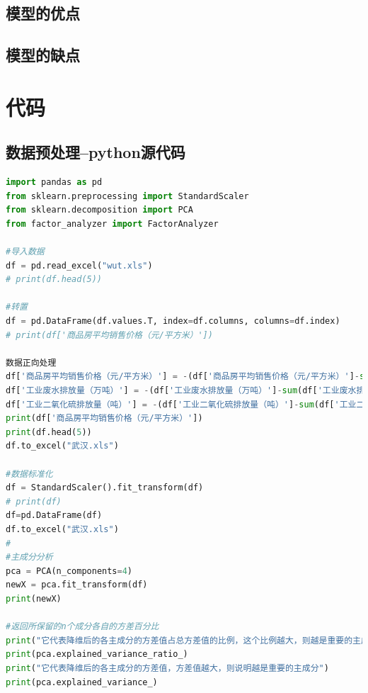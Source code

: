 \documentclass{whutmod}
\begin{document}
	\subsection{模型的优点}

	
	\subsection{模型的缺点}

    
	\newpage	%
	\nocite{*}		%

	
	\newpage
	\appendix %
\section{代码}
\subsection{数据预处理--python源代码}
\begin{lstlisting}[language=python]%这里修改语言
import pandas as pd
from sklearn.preprocessing import StandardScaler
from sklearn.decomposition import PCA
from factor_analyzer import FactorAnalyzer

#导入数据
df = pd.read_excel("wut.xls")
# print(df.head(5))

#转置
df = pd.DataFrame(df.values.T, index=df.columns, columns=df.index)
# print(df['商品房平均销售价格（元/平方米）'])

数据正向处理
df['商品房平均销售价格（元/平方米）'] = -(df['商品房平均销售价格（元/平方米）']-sum(df['商品房平均销售价格（元/平方米）'])/5)
df['工业废水排放量（万吨）'] = -(df['工业废水排放量（万吨）']-sum(df['工业废水排放量（万吨）'])/5)
df['工业二氧化硫排放量（吨）'] = -(df['工业二氧化硫排放量（吨）']-sum(df['工业二氧化硫排放量（吨）'])/5)
print(df['商品房平均销售价格（元/平方米）'])
print(df.head(5))
df.to_excel("武汉.xls")

#数据标准化
df = StandardScaler().fit_transform(df)
# print(df)
df=pd.DataFrame(df)
df.to_excel("武汉.xls")
#
#主成分分析
pca = PCA(n_components=4)
newX = pca.fit_transform(df)
print(newX)

#返回所保留的n个成分各自的方差百分比
print("它代表降维后的各主成分的方差值占总方差值的比例，这个比例越大，则越是重要的主成分")
print(pca.explained_variance_ratio_)
print("它代表降维后的各主成分的方差值，方差值越大，则说明越是重要的主成分")
print(pca.explained_variance_)

\end{lstlisting}
\end{document}
